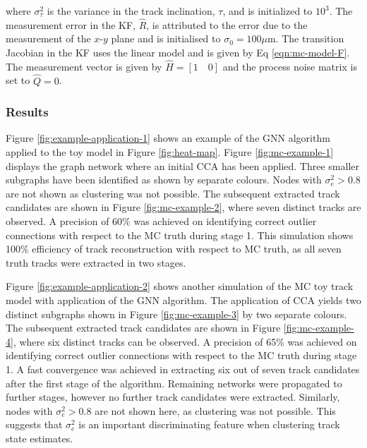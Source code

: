 where $\sigma_{\tau}^2$ is the variance in the track inclination, $\tau$, and is initialized to $10^3$. The measurement error in the KF, $\hat{R}$, is attributed to the error due to the measurement of the $x$-$y$ plane and is initialised to $\sigma_{0} = 100\mu$m. The transition Jacobian in the KF uses the linear model and is given by Eq \eqref{eqn:mc-model-F}. The measurement vector is given by $\hat{H} = [1 \quad 0]$ and the process noise matrix is set to $\hat{Q} = 0$.



\subsubsection{Results}

Figure \ref{fig:example-application-1} shows an example of the GNN algorithm applied to the toy model in Figure \ref{fig:heat-map}. Figure \ref{fig:mc-example-1} displays the graph network where an initial CCA has been applied. Three smaller subgraphs have been identified as shown by separate colours. Nodes with $\sigma_e^2 > 0.8$ are not shown as clustering was not possible. The subsequent extracted track candidates are shown in Figure \ref{fig:mc-example-2}, where seven distinct tracks are observed. A precision of 60\% was achieved on identifying correct outlier connections with respect to the MC truth during stage 1. This simulation shows 100\% efficiency of track reconstruction with respect to MC truth, as all seven truth tracks were extracted in two stages. 

Figure \ref{fig:example-application-2} shows another simulation of the MC toy track model with application of the GNN algorithm. The application of CCA yields two distinct subgraphs shown in Figure \ref{fig:mc-example-3} by two separate colours. The subsequent extracted track candidates are shown in Figure \ref{fig:mc-example-4}, where six distinct tracks can be observed. A precision of 65\% was achieved on identifying correct outlier connections with respect to the MC truth during stage 1. A fast convergence was achieved in extracting six out of seven track candidates after the first stage of the algorithm. Remaining networks were propagated to further stages, however no further track candidates were extracted. Similarly, nodes with $\sigma_e^2 > 0.8$ are not shown here, as clustering was not possible. This suggests that $\sigma_{e}^{2}$ is an important discriminating feature when clustering track state estimates. 


